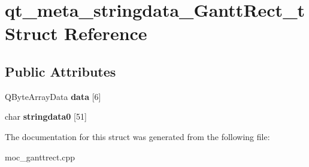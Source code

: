 \hypertarget{structqt__meta__stringdata___gantt_rect__t}{}\section{qt\+\_\+meta\+\_\+stringdata\+\_\+\+Gantt\+Rect\+\_\+t Struct Reference}
\label{structqt__meta__stringdata___gantt_rect__t}
\subsection*{Public Attributes}
\begin{DoxyCompactItemize}
\item 
\hypertarget{structqt__meta__stringdata___gantt_rect__t_a57b6f9eed876c9b7314dadce4917a05c}{}Q\+Byte\+Array\+Data {\bfseries data} \mbox{[}6\mbox{]}\label{structqt__meta__stringdata___gantt_rect__t_a57b6f9eed876c9b7314dadce4917a05c}

\item 
\hypertarget{structqt__meta__stringdata___gantt_rect__t_a87738a6c7d7266096859472fd64b34c6}{}char {\bfseries stringdata0} \mbox{[}51\mbox{]}\label{structqt__meta__stringdata___gantt_rect__t_a87738a6c7d7266096859472fd64b34c6}

\end{DoxyCompactItemize}


The documentation for this struct was generated from the following file\+:\begin{DoxyCompactItemize}
\item 
moc\+\_\+ganttrect.\+cpp\end{DoxyCompactItemize}
